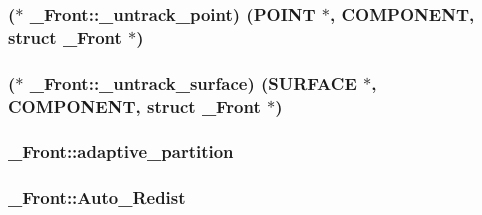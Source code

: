 \subsubsection[{\texorpdfstring{\+\_\+untrack\+\_\+point}{_untrack_point}}]{($\ast$ \+\_\+\+Front\+::\+\_\+untrack\+\_\+point) ({\bf P\+O\+I\+NT} $\ast$, {\bf C\+O\+M\+P\+O\+N\+E\+NT}, struct {\bf \+\_\+\+Front} $\ast$)}\hypertarget{struct___front_a7ae66fc11a5a011e3c13d94b624fa8b9}{}\label{struct___front_a7ae66fc11a5a011e3c13d94b624fa8b9}
\subsubsection[{\texorpdfstring{\+\_\+untrack\+\_\+surface}{_untrack_surface}}]{($\ast$ \+\_\+\+Front\+::\+\_\+untrack\+\_\+surface) ({\bf S\+U\+R\+F\+A\+CE} $\ast$, {\bf C\+O\+M\+P\+O\+N\+E\+NT}, struct {\bf \+\_\+\+Front} $\ast$)}\hypertarget{struct___front_aa8daaf6e0ce80e9c3d6e266b57a50e0d}{}\label{struct___front_aa8daaf6e0ce80e9c3d6e266b57a50e0d}
\subsubsection[{\texorpdfstring{adaptive\+\_\+partition}{adaptive_partition}}]{ \+\_\+\+Front\+::adaptive\+\_\+partition}\hypertarget{struct___front_a8e8e5071693be0cb364790acc405dc9d}{}\label{struct___front_a8e8e5071693be0cb364790acc405dc9d}
\subsubsection[{\texorpdfstring{Auto\+\_\+\+Redist}{Auto_Redist}}]{ \+\_\+\+Front\+::\+Auto\+\_\+\+Redist}\hypertarget{struct___front_a1409547b06de8db54513e25b4c3fe8ff}{}\label{struct___front_a1409547b06de8db54513e25b4c3fe8ff}
